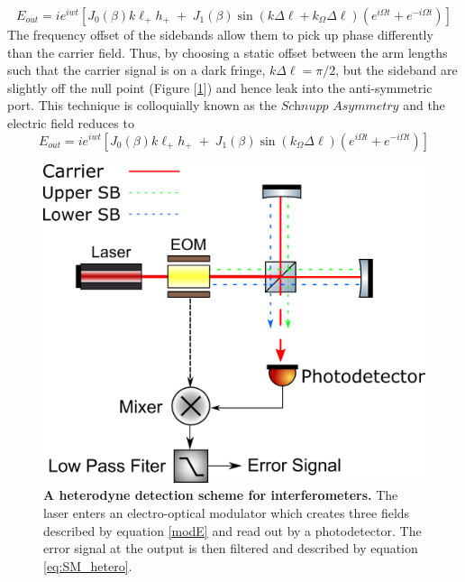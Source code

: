 		\begin{equation}
		E_{out} = i e^{iwt} [ J_0(\beta) 	k \ell_{+}  h_{+}  \; + \; J_1(\beta) \sin( k \Delta \ell + k_{\Omega} \Delta \ell) (e^{i\Omega t}  + e^{-i\Omega t}) ]
		\end{equation}
		The frequency offset of the sidebands allow them to pick up phase differently than the carrier field. Thus, by choosing a static offset between the arm lengths such that the carrier signal is on a dark fringe, $k \Delta \ell = \pi/2$, but the sideband are slightly off the null point (Figure [\ref{fig:MichelsonHetero}]) and hence leak into the anti-symmetric port.  This technique is colloquially known as the $\textit{Schnupp}$ $\textit{Asymmetry}$ and the electric field reduces to
		\begin{equation}
		E_{out} = i e^{iwt} [ J_0(\beta) 	k \ell_{+}  h_{+}  \; + \; J_1(\beta) \sin(k_{\Omega} \Delta \ell) ( e^{i\Omega t} + e^{-i\Omega t}) ]
		\end{equation}
		
		\begin{figure}[h]
			\centering
			\includegraphics[width=.6 \textwidth]{../Figures/SimpleMichelsonHetero.png}
			\caption[A heterodyne detection scheme for interferometers.]  
			{\textbf{A heterodyne detection scheme for interferometers.} The laser enters an electro-optical modulator which creates three fields described by equation \ref{modE} and read out by a photodetector.  The error signal at the output is then filtered and described by equation \ref{eq:SM_hetero}.}
			\label{fig:MichelsonHetero}
		\end{figure}
		

